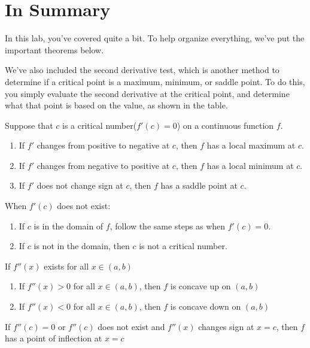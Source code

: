 \documentclass{ximera}
\begin{document}
\section{In Summary}
In this lab, you've covered quite a bit. To help organize everything, we've put the important theorems below.

We've also included the second derivative test, which is another method to determine if a critical point is a maximum, minimum, or saddle point. To do this, you simply evaluate the second derivative at the critical point, and determine what that point is based on the value, as shown in the table.

\begin{theorem}
Suppose that $c$ is a critical number($f'(c)=0$) on a continuous function $f$.
\begin{enumerate}
\item If $f'$ changes from positive to negative at $c$, then $f$ has a local maximum at $c$.
\item If $f'$ changes from negative to positive at $c$, then $f$ has a local minimum at $c$.
\item If $f'$ does not change sign at $c$, then $f$ has a saddle point at $c$.
\end{enumerate}
\begin{remark}
When $f'(c)$ does not exist:
\begin{enumerate}
\item{If $c$ is in the domain of $f$, follow the same steps as when $f'(c)=0\text{.}$}
\item{If $c$ is not in the domain, then $c$ is not a critical number.}
\end{enumerate}
\end{remark}
\end{theorem}

\begin{theorem}
If $f''(x)$ exists for all $x\in(a,b)$ 
\begin{enumerate}
\item{If $f''(x)>0$ for all $x\in(a,b)$, then $f$ is concave up on $(a,b)$}
\item{If $f''(x)<0$ for all $x\in(a,b)$, then $f$ is concave down on $(a,b)$}
\end{enumerate}
\end{theorem}

\begin{theorem}
If $f''(c)=0$ or $f''(c)$ does not exist and $f''(x)$ changes sign at $x=c$, then $f$ has a point of inflection at $x=c$
\end{theorem}
\end{document}
